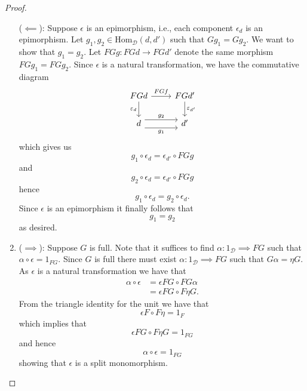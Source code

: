 \begin{proof}
\begin{enumerate}[label=(\roman*)]
      \noindent ($ \impliedby $): Suppose $ \epsilon $ is an epimorphism, i.e., each component $ \epsilon_d $ is an epimorphism. Let $ g_1, g_2 \in \text{Hom}_{\mathcal{D}}(d, d') $ such that $ Gg_1 = Gg_2 $. We want to show that $ g_1 = g_2 $. Let $ FGg: FGd \to FGd' $ denote the same morphism $ FGg_1 = FGg_2 $. Since $ \epsilon $ is a natural transformation, we have the commutative diagram
      \[\begin{tikzcd}
	      FGd & {FGd'} \\
	      d & {d'}
	      \arrow["{\varepsilon_d}"', from=1-1, to=2-1]
	      \arrow["FGf", from=1-1, to=1-2]
	      \arrow["{\varepsilon_{d'}}", from=1-2, to=2-2]
	      \arrow["{g_2}", from=2-1, to=2-2, shift left=2, "\phantom{aa}"'{name=U, below}] %
	      \arrow["{g_1}"', from=2-1, to=2-2, shift right=2, "\phantom{aa}"{name=D, above}] %
      \end{tikzcd}\]
      which gives us
      \begin{equation}
        g_1 \circ \epsilon_d = \epsilon_{d'} \circ FGg
      \end{equation}
      and
      \begin{equation}
        g_2 \circ \epsilon_d = \epsilon_{d'} \circ FGg
      \end{equation}
      hence
      \begin{equation}
        g_1 \circ \epsilon_d = g_2 \circ \epsilon_d.
      \end{equation}
      Since $ \epsilon $ is an epimorphism it finally follows that
      \begin{equation}
        g_1 = g_2
      \end{equation}
      as desired.

    \item ($ \implies $): Suppose $ G $ is full. Note that it suffices to find $ \alpha: 1_\mathcal{D} \implies FG $ such that $ \alpha\circ \epsilon = 1_{FG} $. Since $ G $ is full there must exist $ \alpha: 1_\mathcal{D} \implies FG $ such that $ G\alpha = \eta G $. As $ \epsilon $ is a natural transformation we have that
      \begin{align*}
        \alpha \circ \epsilon &= \epsilon FG \circ FG \alpha \\
                              &= \epsilon FG \circ F \eta G
      .\end{align*}
      From the triangle identity for the unit we have that
      \begin{equation}
        \epsilon F \circ F \eta = 1_F
        \label{eq:triunit}
      \end{equation}
      which implies that
      \begin{equation}
        \epsilon FG \circ F \eta G = 1_{FG}
      \end{equation}
      and hence
      \begin{equation}
        \alpha \circ \epsilon = 1_{FG}
      \end{equation}
      showing that $ \epsilon $ is a split monomorphism.



\end{enumerate}
\end{proof}
